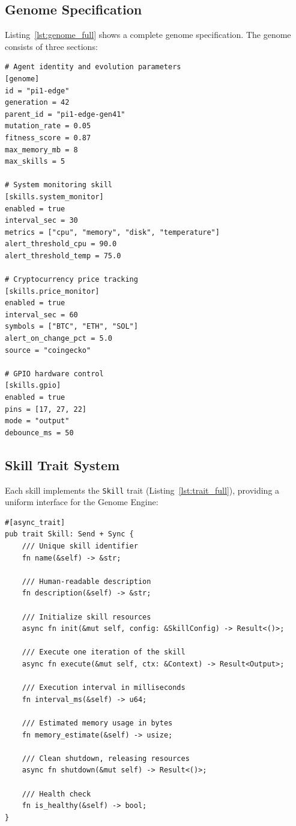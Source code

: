 \documentclass{article}
\newcommand{\genome}{\texttt{genome.toml}}
\begin{document}
\subsection{Genome Specification}

Listing~\ref{lst:genome_full} shows a complete genome specification. The genome consists of three sections:

\begin{lstlisting}[style=tomlcode, caption={Complete \genome{} specification with evolutionary parameters.}, label={lst:genome_full}]
# Agent identity and evolution parameters
[genome]
id = "pi1-edge"
generation = 42
parent_id = "pi1-edge-gen41"
mutation_rate = 0.05
fitness_score = 0.87
max_memory_mb = 8
max_skills = 5

# System monitoring skill
[skills.system_monitor]
enabled = true
interval_sec = 30
metrics = ["cpu", "memory", "disk", "temperature"]
alert_threshold_cpu = 90.0
alert_threshold_temp = 75.0

# Cryptocurrency price tracking
[skills.price_monitor]
enabled = true
interval_sec = 60
symbols = ["BTC", "ETH", "SOL"]
alert_on_change_pct = 5.0
source = "coingecko"

# GPIO hardware control
[skills.gpio]
enabled = true
pins = [17, 27, 22]
mode = "output"
debounce_ms = 50
\end{lstlisting}


\subsection{Skill Trait System}

Each skill implements the \texttt{Skill} trait (Listing~\ref{lst:trait_full}), providing a uniform interface for the Genome Engine:

\begin{lstlisting}[style=rustcode, caption={Full \texttt{Skill} trait with lifecycle methods.}, label={lst:trait_full}]
#[async_trait]
pub trait Skill: Send + Sync {
    /// Unique skill identifier
    fn name(&self) -> &str;
    
    /// Human-readable description
    fn description(&self) -> &str;
    
    /// Initialize skill resources
    async fn init(&mut self, config: &SkillConfig) -> Result<()>;
    
    /// Execute one iteration of the skill
    async fn execute(&mut self, ctx: &Context) -> Result<Output>;
    
    /// Execution interval in milliseconds
    fn interval_ms(&self) -> u64;
    
    /// Estimated memory usage in bytes
    fn memory_estimate(&self) -> usize;
    
    /// Clean shutdown, releasing resources
    async fn shutdown(&mut self) -> Result<()>;
    
    /// Health check
    fn is_healthy(&self) -> bool;
}
\end{lstlisting}
\end{document}

